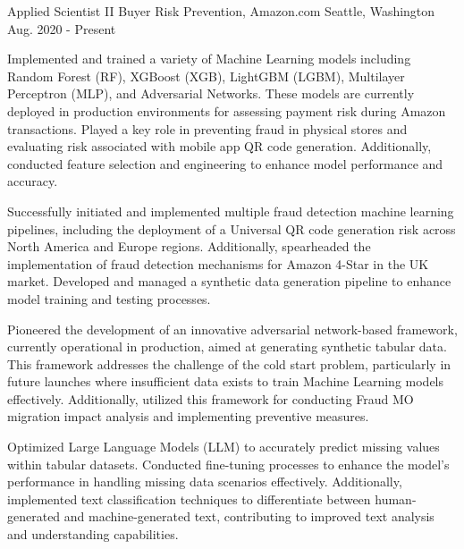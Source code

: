 \begin{cventries}
\cventry
    {Applied Scientist II}
    {Buyer Risk Prevention, Amazon.com}
    {Seattle, Washington}
    {Aug. 2020 - Present}
    {
      \begin{cvitems}
        \item {Implemented and trained a variety of Machine Learning models including Random Forest (RF), XGBoost (XGB), LightGBM (LGBM), Multilayer Perceptron (MLP), and Adversarial Networks. These models are currently deployed in production environments for assessing payment risk during Amazon transactions. Played a key role in preventing fraud in physical stores and evaluating risk associated with mobile app QR code generation. Additionally, conducted feature selection and engineering to enhance model performance and accuracy.}
        \item{Successfully initiated and implemented multiple fraud detection machine learning pipelines, including the deployment of a Universal QR code generation risk across North America and Europe regions. Additionally, spearheaded the implementation of fraud detection mechanisms for Amazon 4-Star in the UK market. Developed and managed a synthetic data generation pipeline to enhance model training and testing processes.}
        \item {Pioneered the development of an innovative adversarial network-based framework, currently operational in production, aimed at generating synthetic tabular data. This framework addresses the challenge of the cold start problem, particularly in future launches where insufficient data exists to train Machine Learning models effectively. Additionally, utilized this framework for conducting Fraud MO migration impact analysis and implementing preventive measures.}
        \item {Optimized Large Language Models (LLM) to accurately predict missing values within tabular datasets. Conducted fine-tuning processes to enhance the model's performance in handling missing data scenarios effectively. Additionally, implemented text classification techniques to differentiate between human-generated and machine-generated text, contributing to improved text analysis and understanding capabilities.}

\end{cvitems}}
\end{cventries}
